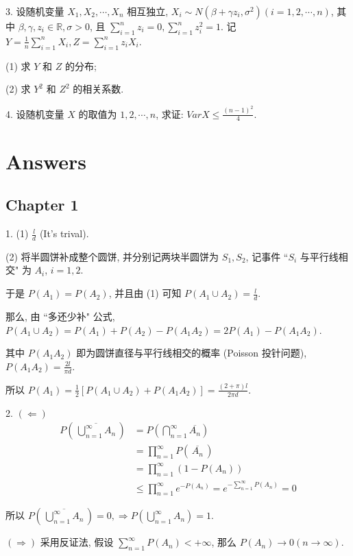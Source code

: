 \documentclass[UTF8]{ctexart}
\begin{document}
3. 设随机变量 $X_1,X_2,\cdots,X_n$ 相互独立, $X_i\sim N(\beta+\gamma z_i,\sigma^2)(i=1,2,\cdots,n)$, 其中 $\beta,\gamma,z_i\in\mathbb{R},\sigma>0$, 且 $\displaystyle\sum\limits_{i=1}^{n}z_i=0, \sum\limits_{i=1}^{n}z_i^2=1$. 记 $\displaystyle Y=\frac{1}{n}\sum\limits_{i=1}^{n}X_i, Z=\sum\limits_{i=1}^{n}z_iX_i$.

(1) 求 $Y$ 和 $Z$ 的分布;

(2) 求 $Y^2$ 和 $Z^2$ 的相关系数.

4. 设随机变量 $X$ 的取值为 $1,2,\cdots,n$, 求证: $Var X \leq \displaystyle\frac{(n-1)^2}{4}$.

\section*{Answers}
\subsection*{Chapter 1}
1. (1) $\displaystyle\frac{l}{d}$ (It's trival).

(2) 将半圆饼补成整个圆饼, 并分别记两块半圆饼为 $S_1,S_2$, 记事件 ``$S_i$ 与平行线相交" 为 $A_i$, $i=1,2$.

于是 $P(A_1)=P(A_2)$, 并且由 (1) 可知 $P(A_1\cup A_2)=\displaystyle\frac{l}{d}$.

那么, 由 ``多还少补" 公式, $P(A_1\cup A_2)=P(A_1)+P(A_2)-P(A_1A_2)=2P(A_1)-P(A_1A_2)$.

其中 $P(A_1A_2)$ 即为圆饼直径与平行线相交的概率 (Poisson 投针问题), $P(A_1A_2)=\displaystyle\frac{2l}{\pi d}$.

所以 $P(A_1)=\displaystyle\frac{1}{2}\left[P(A_1\cup A_2)+P(A_1A_2)\right]=\frac{(2+\pi)l}{2\pi d}$.

2. $(\Leftarrow)$ \[
\begin{aligned}
P\left(\, \overline{\bigcup_{n=1}^{\infty}A_n} \,\right)&=P\left(\bigcap_{n=1}^{\infty}\overline{A_n}\right)\\
 &=\prod_{n=1}^{\infty}P\left(\,\overline{A_n}\,\right) \\
 &=\prod_{n=1}^{\infty}\left(1-P(A_n)\right)\\
 &\leq\prod_{n=1}^{\infty}e^{-P(A_n)}=e^{-\sum\limits_{n=1}^{\infty}P(A_n)}=0
\end{aligned}
\]

所以 $\displaystyle P\left(\, \overline{\bigcup_{n=1}^{\infty}A_n} \,\right)=0, \Rightarrow P\left(\bigcup_{n=1}^{\infty}A_n\right)=1$.

$(\Rightarrow)$ 采用反证法, 假设 $\displaystyle\sum\limits_{n=1}^{\infty}P(A_n)<+\infty$, 那么 $P(A_n)\rightarrow0(n\rightarrow\infty)$.
\end{document}
